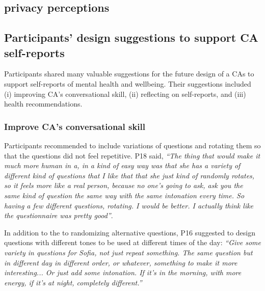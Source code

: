     \subsection{privacy perceptions}
  

    \subsection{Participants' design suggestions to support \ac{CA} self-reports }
        Participants shared many valuable suggestions for the future design of a \acp{CA} to support self-reports of mental health and wellbeing. Their suggestions included
            (i) improving \ac{CA}'s conversational skill,
            (ii) reflecting on self-reports, and
            (iii) health recommendations.

        \subsubsection{Improve \ac{CA}'s conversational skill}

                Participants recommended to include variations of questions and rotating them so that the questions did not feel repetitive. P18 said, 
                    \textit{``The thing that would make it much more human in a, in a kind of easy way was that she has a variety of different kind of questions that I like that that she just kind of randomly rotates, so it feels more like a real person, because no one's going to ask, ask you the same kind of question the same way with the same intonation every time. So having a few different questions, rotating. I would be better. I actually think like the questionnaire was pretty good''}.
                
                In addition to the to randomizing alternative questions, P16 suggested to design questions with different tones to be used at different times of the day: 
                    \textit{``Give some variety in questions for Sofia, not just repeat something. The same question but in different day in different order, or whatever, something to make it more interesting... Or just add some intonation. If it's in the morning, with more energy, if it's at night, completely different.'' }
                
